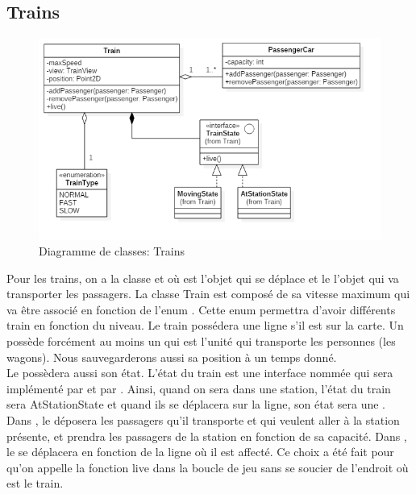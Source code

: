 \documentclass[report, backcover, french, nodocumentinfo]{upmethodology-document}
\begin{document}
			\subsection{Trains}
				\begin{figure}[h!]
					\centering
					\includegraphics[width=1\textwidth]{figures/TrainClassDiagram}
					\caption{Diagramme de classes: Trains}
					\label{fig:TrainClassDiagram}
				\end{figure}
				Pour les trains, on a la classe  et  où  est l'objet qui se déplace et le  l'objet qui va transporter les passagers. La classe Train est composé de sa vitesse maximum qui va être associé en fonction de l'enum  . Cette enum permettra d'avoir différents train en fonction du niveau. Le train possédera une ligne s'il est sur la carte. Un   possède forcément au moins un   qui est l'unité qui transporte les personnes (les wagons). Nous sauvegarderons aussi sa position à un temps donné.\\
				Le   possèdera aussi son état. L'état du train est une interface nommée  qui sera implémenté par  et par . Ainsi, quand on sera dans une station, l'état du train sera AtStationState et quand ils se déplacera sur la ligne, son état sera une  . Dans , le  déposera les passagers qu'il transporte et qui veulent aller à la station présente, et prendra les passagers de la station en fonction de sa capacité. Dans , le  se déplacera en fonction de la ligne où il est affecté. Ce choix a été fait pour qu'on appelle la fonction live dans la boucle de jeu sans se soucier de l'endroit où est le train.
\end{document}
